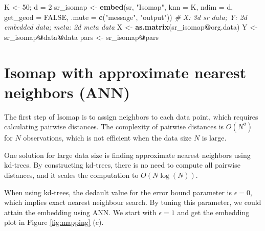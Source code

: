\documentclass[11pt,a4paper,]{article}
\newenvironment{Shaded}{\begin{snugshade}}{\end{snugshade}}
\newcommand{\CommentTok}[1]{\textcolor[rgb]{0.56,0.35,0.01}{\textit{#1}}}
\newcommand{\DataTypeTok}[1]{\textcolor[rgb]{0.13,0.29,0.53}{#1}}
\newcommand{\DecValTok}[1]{\textcolor[rgb]{0.00,0.00,0.81}{#1}}
\newcommand{\KeywordTok}[1]{\textcolor[rgb]{0.13,0.29,0.53}{\textbf{#1}}}
\newcommand{\NormalTok}[1]{#1}
\newcommand{\OperatorTok}[1]{\textcolor[rgb]{0.81,0.36,0.00}{\textbf{#1}}}
\newcommand{\OtherTok}[1]{\textcolor[rgb]{0.56,0.35,0.01}{#1}}
\newcommand{\StringTok}[1]{\textcolor[rgb]{0.31,0.60,0.02}{#1}}
\begin{document}
\begin{Shaded}
\begin{Highlighting}[]
\NormalTok{K \textless{}{-}}\StringTok{ }\DecValTok{50}\NormalTok{; d =}\StringTok{ }\DecValTok{2}
\NormalTok{sr\_isomap \textless{}{-}}\StringTok{ }\KeywordTok{embed}\NormalTok{(sr, }\StringTok{"Isomap"}\NormalTok{, }\DataTypeTok{knn =}\NormalTok{ K, }\DataTypeTok{ndim =}\NormalTok{ d, }\DataTypeTok{get\_geod =} \OtherTok{FALSE}\NormalTok{, }
                   \DataTypeTok{.mute =} \KeywordTok{c}\NormalTok{(}\StringTok{"message"}\NormalTok{, }\StringTok{"output"}\NormalTok{))}
\CommentTok{\# X: 3d sr data; Y: 2d embedded data; meta: 2d meta data}
\NormalTok{X \textless{}{-}}\StringTok{ }\KeywordTok{as.matrix}\NormalTok{(sr\_isomap}\OperatorTok{@}\NormalTok{org.data)}
\NormalTok{Y \textless{}{-}}\StringTok{ }\NormalTok{sr\_isomap}\OperatorTok{@}\NormalTok{data}\OperatorTok{@}\NormalTok{data}
\NormalTok{pars \textless{}{-}}\StringTok{ }\NormalTok{sr\_isomap}\OperatorTok{@}\NormalTok{pars}
\end{Highlighting}
\end{Shaded}

\hypertarget{isomap-with-approximate-nearest-neighbors-ann}{%
\section{Isomap with approximate nearest neighbors (ANN)}\label{isomap-with-approximate-nearest-neighbors-ann}}

The first step of Isomap is to assign neighbors to each data point, which requires calculating pairwise distances. The complexity of pairwise distances is \(O(N^2)\) for \(N\) observations, which is not efficient when the data size \(N\) is large.

One solution for large data size is finding approximate nearest neighbors using kd-trees. By constructing kd-trees, there is no need to compute all pairwise distances, and it scales the computation to \(O(N\log(N))\).

When using kd-trees, the dedault value for the error bound parameter is \(\epsilon=0\), which implies exact nearest neighbour search. By tuning this parameter, we could attain the embedding using ANN. We start with \(\epsilon=1\) and get the embedding plot in Figure \ref{fig:mapping} (c).
\end{document}
